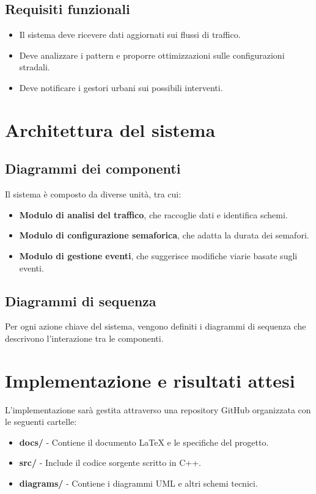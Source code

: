 \documentclass[a4paper,12pt]{article}
\begin{document}
\subsection{Requisiti funzionali}
\begin{itemize}
    \item Il sistema deve ricevere dati aggiornati sui flussi di traffico.
    \item Deve analizzare i pattern e proporre ottimizzazioni sulle configurazioni stradali.
    \item Deve notificare i gestori urbani sui possibili interventi.
\end{itemize}

\newpage

\section{Architettura del sistema}
\subsection{Diagrammi dei componenti}
Il sistema è composto da diverse unità, tra cui:
\begin{itemize}
    \item \textbf{Modulo di analisi del traffico}, che raccoglie dati e identifica schemi.
    \item \textbf{Modulo di configurazione semaforica}, che adatta la durata dei semafori.
    \item \textbf{Modulo di gestione eventi}, che suggerisce modifiche viarie basate sugli eventi.
\end{itemize}

\subsection{Diagrammi di sequenza}
Per ogni azione chiave del sistema, vengono definiti i diagrammi di sequenza che descrivono l'interazione tra le componenti.

\newpage

\section{Implementazione e risultati attesi}
L'implementazione sarà gestita attraverso una repository GitHub organizzata con le seguenti cartelle:
\begin{itemize}
    \item \textbf{docs/} - Contiene il documento LaTeX e le specifiche del progetto.
    \item \textbf{src/} - Include il codice sorgente scritto in C++.
    \item \textbf{diagrams/} - Contiene i diagrammi UML e altri schemi tecnici.
\end{itemize}
\end{document}
